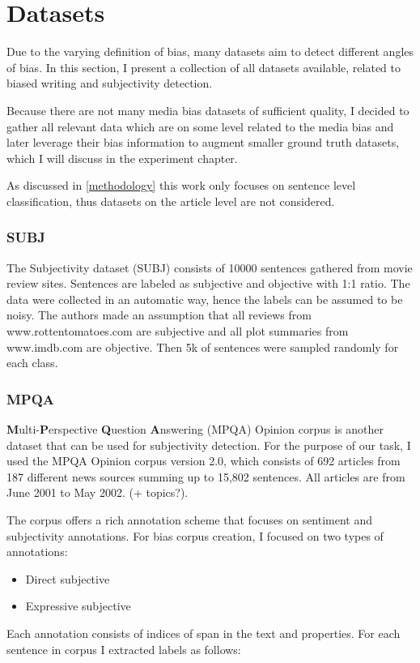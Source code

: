 \chapter{Datasets}
Due to the varying definition of bias, many datasets aim to detect different angles of bias. In this section, I present a collection of all datasets available, related to biased writing and subjectivity detection.

Because there are not many media bias datasets of sufficient quality, I decided to gather all relevant data which are on some level related to the media bias and later leverage their bias information to augment smaller ground truth datasets, which I will discuss in the experiment chapter.

As discussed in \ref{methodology} this work only focuses on sentence level classification, thus datasets on the article level are not considered.



\subsection{SUBJ}
The Subjectivity dataset (SUBJ) \cite{Pang+Lee:04a} consists of 10000 sentences gathered from movie review sites. Sentences are labeled as subjective and objective with 1:1 ratio. The data were collected in an automatic way, hence the labels can be assumed to be noisy. The authors made an assumption that all reviews from www.rottentomatoes.com are subjective and all plot summaries from www.imdb.com are objective. Then 5k of sentences were sampled randomly for each class.




\subsection{MPQA}
\textbf{M}ulti-\textbf{P}erspective \textbf{Q}uestion \textbf{A}nswering (MPQA) Opinion corpus is another dataset that can be used for subjectivity detection. For the purpose of our task, I used the MPQA Opinion corpus version 2.0, which consists of 692 articles from 187 different news sources summing up to 15,802 sentences. All articles are from June 2001 to May 2002. (+ topics?).

The corpus offers a rich annotation scheme \cite{wiebe2005annotating} that focuses on sentiment and subjectivity annotations. For bias corpus creation, I focused on two types of annotations:
\begin{itemize}
    \item Direct subjective
    \item Expressive subjective
\end{itemize}
Each annotation consists of indices of span in the text and properties. For each sentence in corpus I extracted labels as follows:

